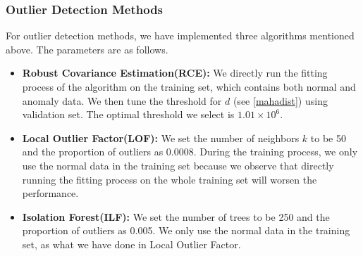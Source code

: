 \documentclass[english]{article}
\begin{document}
\subsubsection{Outlier Detection Methods}
\par For outlier detection methods, we have implemented three algorithms mentioned above. The parameters are as follows.
\begin{itemize}
\item \textbf{Robust Covariance Estimation(RCE): } We directly run the fitting process of the algorithm on the training set, which contains both normal and anomaly data. We then tune the threshold for $d$ (see \ref{mahadist}) using validation set. The optimal threshold we select is $1.01 \times 10^6$. 
\item \textbf{Local Outlier Factor(LOF): } We set the number of neighbors $k$ to be 50 and the proportion of outliers as 0.0008. During the training process, we only use the normal data in the training set because we observe that directly running the fitting process on the whole training set will worsen the performance.
\item \textbf{Isolation Forest(ILF): } We set the number of trees to be 250 and the proportion of outliers as 0.005. We only use the normal data in the training set, as what we have done in Local Outlier Factor. 
\end{itemize}
\end{document}
